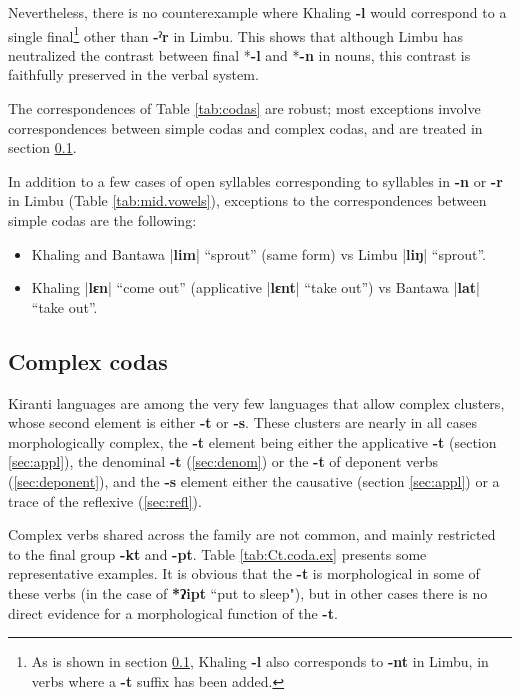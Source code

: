 \documentclass[oldfontcommands,oneside,a4paper,11pt]{article}
\newcommand{\ipa}[1]{\textbf{{\phon\mbox{#1}}}} %
\newcommand{\dhatu}[2]{|\ipa{#1}| ``#2''}
\begin{document}
Nevertheless, there is no counterexample where Khaling \ipa{-l} would correspond to a single final\footnote{As is shown in section \ref{sec:Ct}, Khaling \ipa{-l} also corresponds to \ipa{-nt} in Limbu, in verbs where a \ipa{-t} suffix has been added.} other than \ipa{-ˀr} in Limbu. This shows that although Limbu has neutralized the contrast between final *\ipa{-l} and  *\ipa{-n} in nouns, this contrast is faithfully preserved in the verbal system.


The correspondences of Table \ref{tab:codas} are robust; most exceptions involve correspondences between simple codas and complex codas, and are treated in section \ref{sec:Ct}. 

In addition to a few cases of open syllables corresponding to syllables in \ipa{-n} or \ipa{-r} in Limbu (Table \ref{tab:mid.vowels}), exceptions to the correspondences between simple codas are the following:

\begin{itemize}
\item Khaling and Bantawa \dhatu{lim}{sprout}	 (same form) vs Limbu	\dhatu{liŋ}{sprout}.
\item Khaling \dhatu{lɛn}{come out} (applicative 	\dhatu{lɛnt}{take out}) vs Bantawa  \dhatu{lat}{take out}.
\end{itemize}


\subsection{Complex codas} \label{sec:Ct}
Kiranti languages are among the very few languages that allow complex clusters, whose second element is either \ipa{-t} or \ipa{-s}. These clusters are nearly in all cases morphologically complex, the \ipa{-t} element being either the applicative \ipa{-t} (section \ref{sec:appl}), the denominal \ipa{-t} (\ref{sec:denom}) or the \ipa{-t} of deponent verbs (\ref{sec:deponent}), and the \ipa{-s} element either the causative (section \ref{sec:appl}) or a trace of the reflexive (\ref{sec:refl}).

Complex verbs shared across the family are not common, and mainly restricted to the final group \ipa{-kt} and \ipa{-pt}. Table \ref{tab:Ct.coda.ex} presents some representative examples. It is obvious that the \ipa{-t} is morphological in some of these verbs (in the case of \ipa{*ʔipt} ``put to sleep"), but in other cases there is no direct evidence for a morphological function of the \ipa{-t}.
\end{document}
